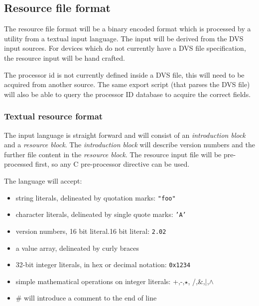 \documentclass{article}
\begin{document}
\subsection{Resource file format}

  The resource file format will be a binary encoded format which is processed
by a utility from a textual input language.  The input will be derived from
the DVS input sources.  For devices which do not currently have a DVS file
specification, the resource input will be hand crafted.

\chgbarbegin
  The processor id is not currently defined inside a DVS file, this will need
to be acquired from another source.  The same export script (that parses the
DVS file) will also be able to query the processor ID database to acquire
the correct fields.
\chgbarend

\subsubsection{Textual resource format}

  The input language is straight forward and will consist of an 
\textit{introduction block} and a \textit{resource block}.  
The \textit{introduction block} will describe version numbers and the further 
file content in the \textit{resource block}.  The resource input file will
be pre-processed first, so any C pre-processor directive can be used.

  The language will accept:
  \begin{itemize}
    \item string literals, delineated by quotation marks: \texttt{"foo"}
    \item character literals, delineated by single quote marks: \texttt{'A'}
    \item version numbers, 16 bit literal.16 bit literal: \texttt{2.02}
    \item a value array, delineated by curly braces
    \item 32-bit integer literals, in hex or decimal notation: \texttt{0x1234}
    \item simple mathematical operations on integer literals: +,-,$\star$,
          /,\&,$\mid$,$\wedge$
    \item \# will introduce a comment to the end of line
  \end{itemize}
\end{document}
